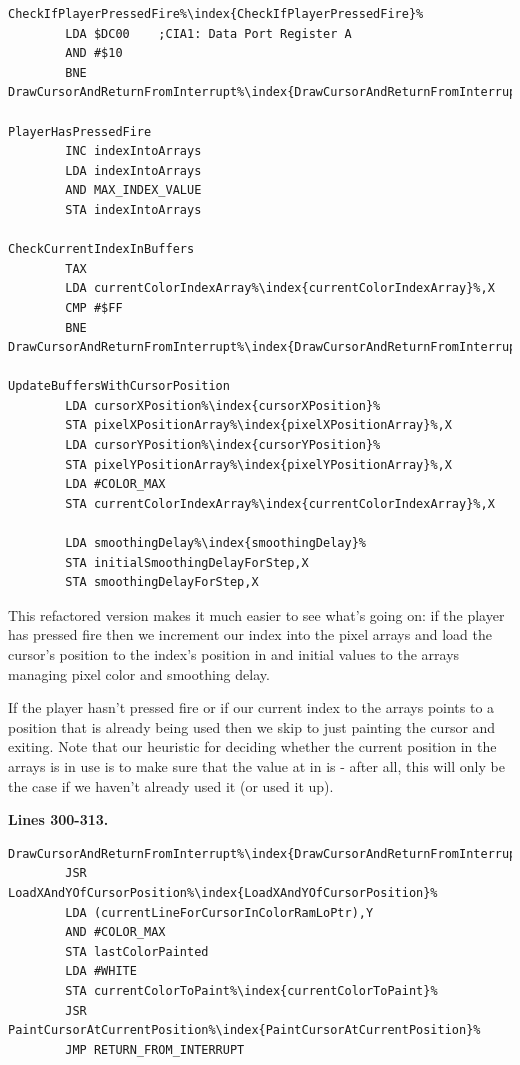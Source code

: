 \begin{lstlisting}[escapechar=\%]
CheckIfPlayerPressedFire%\index{CheckIfPlayerPressedFire}%   
        LDA $DC00    ;CIA1: Data Port Register A
        AND #$10
        BNE DrawCursorAndReturnFromInterrupt%\index{DrawCursorAndReturnFromInterrupt}%

PlayerHasPressedFire
        INC indexIntoArrays
        LDA indexIntoArrays
        AND MAX_INDEX_VALUE
        STA indexIntoArrays

CheckCurrentIndexInBuffers  
        TAX 
        LDA currentColorIndexArray%\index{currentColorIndexArray}%,X
        CMP #$FF
        BNE DrawCursorAndReturnFromInterrupt%\index{DrawCursorAndReturnFromInterrupt}%

UpdateBuffersWithCursorPosition
        LDA cursorXPosition%\index{cursorXPosition}%
        STA pixelXPositionArray%\index{pixelXPositionArray}%,X
        LDA cursorYPosition%\index{cursorYPosition}%
        STA pixelYPositionArray%\index{pixelYPositionArray}%,X
        LDA #COLOR_MAX
        STA currentColorIndexArray%\index{currentColorIndexArray}%,X

        LDA smoothingDelay%\index{smoothingDelay}%
        STA initialSmoothingDelayForStep,X
        STA smoothingDelayForStep,X
\end{lstlisting}

This refactored version makes it much easier to see what's going on: if the player has pressed fire then we increment
our index into the pixel arrays and load the cursor's position to the index's position in 
and initial values to the arrays managing pixel color and smoothing delay.

If the player hasn't pressed fire or if our current index to the arrays points to a position that is already being used then
we skip to just painting the cursor and exiting. Note that our heuristic for deciding whether the current position in the 
arrays is in use is to make sure that the value at  in  is  - 
after all, this will only be the case if we haven't already used it (or used it up).

\clearpage
\textbf{Lines 300-313. }
\begin{lstlisting}[caption = Paint the cursor and call the system default interrupt handler \icode{RETURN\_FROM\_INTERRUPT},escapechar=\%]
DrawCursorAndReturnFromInterrupt%\index{DrawCursorAndReturnFromInterrupt}%   
        JSR LoadXAndYOfCursorPosition%\index{LoadXAndYOfCursorPosition}%
        LDA (currentLineForCursorInColorRamLoPtr),Y
        AND #COLOR_MAX
        STA lastColorPainted
        LDA #WHITE
        STA currentColorToPaint%\index{currentColorToPaint}%
        JSR PaintCursorAtCurrentPosition%\index{PaintCursorAtCurrentPosition}%
        JMP RETURN_FROM_INTERRUPT

\end{lstlisting}

